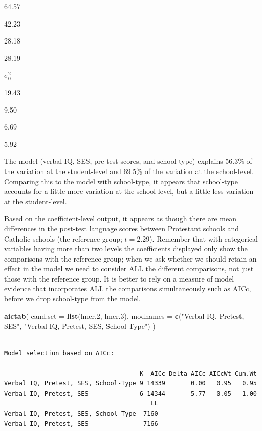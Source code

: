 \documentclass[]{book}
\newenvironment{Shaded}{\begin{snugshade}}{\end{snugshade}}
\newcommand{\DataTypeTok}[1]{\textcolor[rgb]{0.13,0.29,0.53}{#1}}
\newcommand{\FloatTok}[1]{\textcolor[rgb]{0.00,0.00,0.81}{#1}}
\newcommand{\KeywordTok}[1]{\textcolor[rgb]{0.13,0.29,0.53}{\textbf{#1}}}
\newcommand{\NormalTok}[1]{#1}
\newcommand{\StringTok}[1]{\textcolor[rgb]{0.31,0.60,0.02}{#1}}
\begin{document}
64.57

42.23

28.18

28.19

\(\sigma^2_{0}\)

19.43

9.50

6.69

5.92

The model (verbal IQ, SES, pre-test scores, and school-type) explains 56.3\% of the variation at the student-level and 69.5\% of the variation at the school-level. Comparing this to the model with school-type, it appears that school-type accounts for a little more variation at the school-level, but a little less variation at the student-level.

Based on the coefficient-level output, it appears as though there are mean differences in the post-test language scores between Protestant schools and Catholic schools (the reference group; \(t=2.29\)). Remember that with categorical variables having more than two levels the coefficients displayed only show the comparisons with the reference group; when we ask whether we should retain an effect in the model we need to consider ALL the different comparisons, not just those with the reference group. It is better to rely on a measure of model evidence that incorporates ALL the comparisons simultaneously such as AICc, before we drop school-type from the model.

\begin{Shaded}
\begin{Highlighting}[]
\KeywordTok{aictab}\NormalTok{(}
  \DataTypeTok{cand.set =} \KeywordTok{list}\NormalTok{(lmer}\FloatTok{.2}\NormalTok{, lmer}\FloatTok{.3}\NormalTok{), }
  \DataTypeTok{modnames =} \KeywordTok{c}\NormalTok{(}\StringTok{"Verbal IQ, Pretest, SES"}\NormalTok{, }\StringTok{"Verbal IQ, Pretest, SES, School-Type"}\NormalTok{)}
\NormalTok{)}
\end{Highlighting}
\end{Shaded}

\begin{verbatim}

Model selection based on AICc:

                                     K  AICc Delta_AICc AICcWt Cum.Wt
Verbal IQ, Pretest, SES, School-Type 9 14339       0.00   0.95   0.95
Verbal IQ, Pretest, SES              6 14344       5.77   0.05   1.00
                                        LL
Verbal IQ, Pretest, SES, School-Type -7160
Verbal IQ, Pretest, SES              -7166
\end{verbatim}
\end{document}
